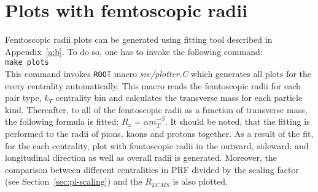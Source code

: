   \section{Plots with femtoscopic radii}
    Femtoscopic radii plots can be generated using fitting tool described in Appendix~\ref{a:b}.
    To do so, one has to invoke the following command:\\
    \verb|make plots|\\
    This command invokes \verb|ROOT| macro \textit{src/plotter.C} which generates all plots for the every centrality automatically.
    This macro reads the femtoscopic radii for each pair type, $k_T$ centrality bin and calculates the transverse mass for each particle kind.
    Thereafter, to all of the femtoscopic radii as a function of transverse mass, the following formula is fitted: $R_x=\alpha m_T^{-\beta}$.
    It should be noted, that the fitting is performed to the radii of pions, kaons and protons together.
    As a result of the fit, for the each centrality, plot with femtoscopic radii in the outward, sideward, and longitudinal direction as well as overall radii is generated.
    Moreover, the comparison between different centralities in PRF divided by the scaling factor (see Section~\ref{sec:pi-scaling}) and the $R_{LCMS}$ is also plotted.

